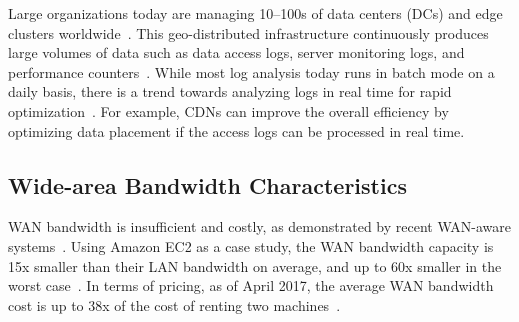 
 Large organizations today are managing
10--100s of data centers (DCs) and edge clusters
worldwide~\cite{calder2013mapping}. This geo-distributed infrastructure
continuously produces large volumes of data such as data access logs, server
monitoring logs, and performance counters~\cite{pu2015low,
  alspaugh2014analyzing, vulimiri2015global}. While most log analysis today runs
in batch mode on a daily basis, there is a trend towards analyzing logs in real
time for rapid optimization~\cite{rabkin2014aggregation}. For example, CDNs can
improve the overall efficiency by optimizing data placement if the access logs
can be processed in real time.



\subsection{Wide-area Bandwidth Characteristics}
\label{sec:wide-area-bandwidth}

WAN bandwidth is insufficient and costly, as demonstrated by recent WAN-aware
systems~\cite{pu2015low, vulimiri2015global, vulimiri2015wananlytics,
  hsieh17gaia}. Using Amazon EC2 as a case study, the WAN bandwidth capacity is
15x smaller than their LAN bandwidth on average, and up to 60x smaller in the
worst case~\cite{hsieh17gaia}. In terms of pricing, as of April 2017, the
average WAN bandwidth cost is up to 38x of the cost of renting two
machines~\cite{amazon2017pricing, hsieh17gaia}.

